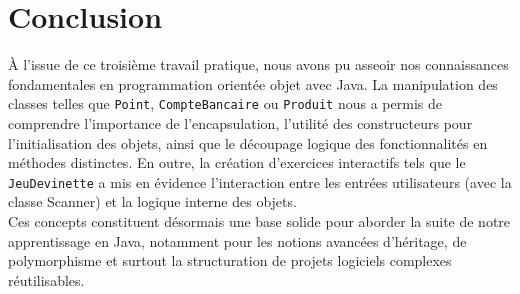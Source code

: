 
\chapter*{Conclusion}

\`{A} l'issue de ce troisi\`{e}me travail pratique, nous avons pu asseoir nos connaissances fondamentales en programmation orient\'{e}e objet avec Java. La manipulation des classes telles que \texttt{Point}, \texttt{CompteBancaire} ou \texttt{Produit} nous a permis de comprendre l'importance de l'encapsulation, l'utilit\'{e} des constructeurs pour l'initialisation des objets, ainsi que le d\'{e}coupage logique des fonctionnalit\'{e}s en m\'{e}thodes distinctes. En outre, la cr\'{e}ation d'exercices interactifs tels que le \texttt{JeuDevinette} a mis en \'{e}vidence l'interaction entre les entr\'{e}es utilisateurs (avec la classe Scanner) et la logique interne des objets.\\

Ces concepts constituent d\'{e}sormais une base solide pour aborder la suite de notre apprentissage en Java, notamment pour les notions avanc\'{e}es d'h\'{e}ritage, de polymorphisme et surtout la structuration de projets logiciels complexes r\'{e}utilisables.
